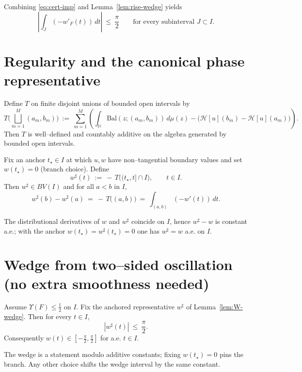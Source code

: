 Combining \eqref{eq:cert-imp} and Lemma~\ref{lem:rise-wedge} yields
\begin{equation}\label{eq:two-sided}
\left|\int_{J} (-w'_F(t))\,dt\right|\ \le\ \frac{\pi}{2}\qquad\text{for every subinterval }J\subset I.
\end{equation}

\section*{Regularity and the canonical phase representative}

\begin{lemma}\label{lem:add-wedge}
Define $T$ on finite disjoint unions of bounded open intervals by
\[
T\Big(\bigsqcup_{m=1}^M (a_m,b_m)\Big)\ :=\ \sum_{m=1}^M\left(\int_{\mathbb{H}}\mathrm{Bal}(z;(a_m,b_m))\,d\mu(z)
-\big(\mathcal{H}[u](b_m)-\mathcal{H}[u](a_m)\big)\right).
\]
Then $T$ is well–defined and countably additive on the algebra generated by bounded open intervals.
\end{lemma}

\begin{lemma}\label{lem:W-wedge}
Fix an anchor $t_\star\in I$ at which $u,w$ have non–tangential boundary values and set $w(t_\star)=0$ (branch choice). Define
\[w^\sharp(t)\ :=\ -\,T\big((t_\star,t]\cap I\big),\qquad t\in I.\]
Then $w^\sharp\in BV(I)$ and for all $a<b$ in $I$,
\[w^\sharp(b)-w^\sharp(a)\ =\ -\,T\big((a,b)\big)\ =\ \int_{(a,b)} (-w'(t))\,dt.\]
\end{lemma}

\begin{lemma}[Identification $w^\sharp=w$ a.e.]\label{lem:identify-wedge}
The distributional derivatives of $w$ and $w^\sharp$ coincide on $I$, hence $w^\sharp-w$ is constant a.e.; with the anchor $w(t_\star)=w^\sharp(t_\star)=0$ one has $w^\sharp=w$ a.e. on $I$.
\end{lemma}

\section*{Wedge from two–sided oscillation (no extra smoothness needed)}

\begin{theorem}\label{thm:wedge}
Assume $\Upsilon(F)\le \tfrac12$ on $I$. Fix the anchored representative $w^\sharp$ of Lemma~\ref{lem:W-wedge}. Then for every $t\in I$,
\[|w^\sharp(t)|\ \le\ \frac{\pi}{2}.\]
Consequently $w(t)\in[-\tfrac{\pi}{2},\tfrac{\pi}{2}]$ for a.e. $t\in I$.
\end{theorem}

\begin{remark}[Anchoring]
The wedge is a statement modulo additive constants; fixing $w(t_\star)=0$ pins the branch. Any other choice shifts the wedge interval by the same constant.
\end{remark}
